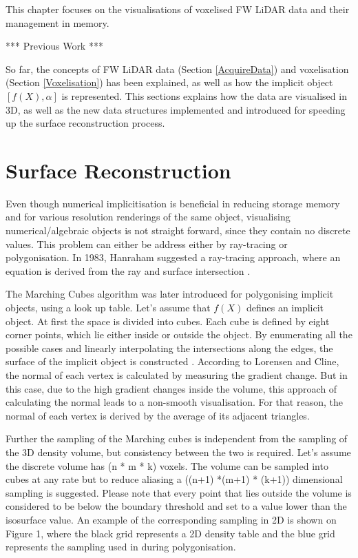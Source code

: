 \documentclass{subfiles}
\begin{document}
	

\par This chapter focuses on the visualisations of voxelised FW LiDAR data and their management in memory.

*** Previous Work *** 

\par So far, the concepts of FW LiDAR data (Section \ref{AcquireData}) and voxelisation (Section \ref{Voxelisation}) has been explained, as well as how the implicit object $[f(X),\alpha]$ is represented. This sections explains how the data are visualised in 3D, as well as the new data structures implemented and introduced for speeding up the surface reconstruction process. 


\section {Surface Reconstruction}\label{sec:SurfaceReconstruction}
\par Even though numerical implicitisation is beneficial in reducing storage memory and for various resolution renderings of the same object, visualising numerical/algebraic objects is not straight forward, since they contain no discrete values. This problem can either be address either by ray-tracing or polygonisation. In 1983, Hanraham suggested a ray-tracing approach, where an equation is derived from the ray and surface intersection \cite{Hanrahan1983}.  

\par The Marching Cubes algorithm was later introduced for polygonising implicit objects, using a look up table. Let’s assume that $f(X)$ defines an implicit object. At first the space is divided into cubes. Each cube is defined by eight corner points, which lie either inside or outside the object. By enumerating all the possible cases and linearly interpolating the intersections along the edges, the surface of the implicit object is constructed \cite{Lorensen1987}. According to Lorensen and Cline, the normal of each vertex is calculated by measuring the gradient change. But in this case, due to the high gradient changes inside the volume, this approach of calculating the normal leads to a non-smooth visualisation. For that reason, the normal of each vertex is derived by the average of its adjacent triangles. 

\par Further the sampling of the Marching cubes is independent from the sampling of the 3D density volume, but consistency between the two is required. Let’s assume the discrete volume has (n * m * k) voxels. The volume can be sampled into cubes at any rate but to reduce aliasing a ((n+1) *(m+1) * (k+1)) dimensional sampling is suggested. Please note that every point that lies outside the volume is considered to be below the boundary threshold and set to a value lower than the isosurface value. An example of the corresponding sampling in 2D is shown on Figure 1, where the black grid represents a 2D density table and the blue grid represents the sampling used in during polygonisation.
\end{document}
